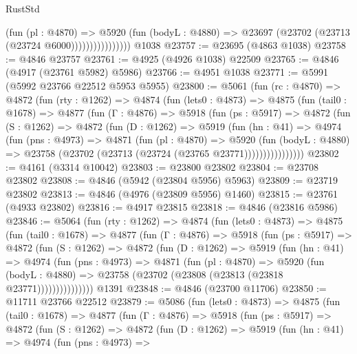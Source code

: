 \begin{lexlean}{RustStd}
\begin{coremodule}
                          (fun (pl : @4870) =>
                          @5920
                            (fun (bodyL : @4880) =>
                            @23697 (@23702 (@23713 (@23724 @6000))))))))))))))))
    @1038
@23757 := @23695 (@4863 @1038)
@23758 := @4846 @23757
@23761 := @4925 (@4926 @1038) @22509
@23765 := @4846 (@4917 (@23761 @5982) @5986)
@23766 := @4951 @1038
@23771 := @5991 (@5992 @23766 @22512 @5953 @5955)
@23800 := @5061
    (fun (rc : @4870) =>
    @4872
      (fun (rty : @1262) =>
      @4874
        (fun (lets0 : @4873) =>
        @4875
          (fun (tail0 : @1678) =>
          @4877
            (fun (Γ : @4876) =>
            @5918
              (fun (ps : @5917) =>
              @4872
                (fun (S : @1262) =>
                @4872
                  (fun (D : @1262) =>
                  @5919
                    (fun (hn : @41) =>
                    @4974
                      (fun (pns : @4973) =>
                      @4871
                        (fun (pl : @4870) =>
                        @5920
                          (fun (bodyL : @4880) =>
                          @23758 (@23702 (@23713 (@23724 (@23765 @23771))))))))))))))))
@23802 := @4161 (@3314 @10042)
@23803 := @23800 @23802
@23804 := @23708 @23802
@23808 := @4846 (@5942 (@23804 @5956) @5963)
@23809 := @23719 @23802
@23813 := @4846 (@4976 (@23809 @5956) @1460)
@23815 := @23761 (@4933 @23802)
@23816 := @4917 @23815
@23818 := @4846 (@23816 @5986)
@23846 := @5064
    (fun (rty : @1262) =>
    @4874
      (fun (lets0 : @4873) =>
      @4875
        (fun (tail0 : @1678) =>
        @4877
          (fun (Γ : @4876) =>
          @5918
            (fun (ps : @5917) =>
            @4872
              (fun (S : @1262) =>
              @4872
                (fun (D : @1262) =>
                @5919
                  (fun (hn : @41) =>
                  @4974
                    (fun (pns : @4973) =>
                    @4871
                      (fun (pl : @4870) =>
                      @5920
                        (fun (bodyL : @4880) =>
                        @23758 (@23702 (@23808 (@23813 (@23818 @23771)))))))))))))))
    @1391
@23848 := @4846 (@23700 @11706)
@23850 := @11711 @23766 @22512
@23879 := @5086
    (fun (lets0 : @4873) =>
    @4875
      (fun (tail0 : @1678) =>
      @4877
        (fun (Γ : @4876) =>
        @5918
          (fun (ps : @5917) =>
          @4872
            (fun (S : @1262) =>
            @4872
              (fun (D : @1262) =>
              @5919
                (fun (hn : @41) =>
                @4974
                  (fun (pns : @4973) =>

\end{coremodule}
\end{lexlean}
